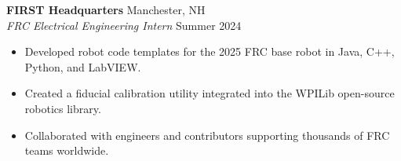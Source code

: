 \textbf{FIRST Headquarters} \hfill Manchester, NH\\
\textit{FRC Electrical Engineering Intern} \hfill Summer 2024
\begin{itemize}
  \item Developed robot code templates for the 2025 FRC base robot in Java, C++, Python, and LabVIEW.
  \item Created a fiducial calibration utility integrated into the WPILib open-source robotics library.
  \item Collaborated with engineers and contributors supporting thousands of FRC teams worldwide.
\end{itemize}
